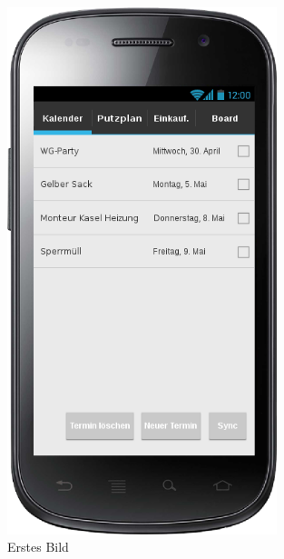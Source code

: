 \begin{figure}[htbp] 
  \centering
     \includegraphics[width=0.7\textwidth]{anhang/mockups/kalender.png}
  \caption{Erstes Bild}
  \label{fig:Bild1}
\end{figure}

